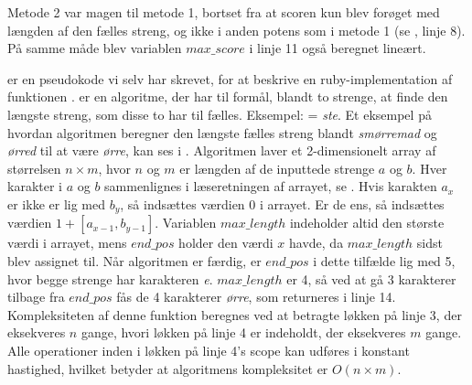 Metode 2 var magen til metode 1, bortset fra at scoren kun blev forøget med længden af den fælles streng, og ikke i anden potens som i metode 1 (se , linje 8). På samme måde blev variablen $max\_score$ i linje 11 også beregnet lineært.

\begin{algorithm} [H]
	\label{alg:compare}
	
\end{algorithm}

\begin{algorithm} [H]
	\label{alg:longest-common-substring}
	
\end{algorithm}

 er en pseudokode vi selv har skrevet, for at beskrive en ruby-implementation\cite{longestcommonsubstringrubywiki} af funktionen .  er en algoritme, der har til formål, blandt to strenge, at finde den længste streng, som disse to har til fælles. Eksempel:  = \textit{ste}. Et eksempel på hvordan algoritmen beregner den længste fælles streng blandt \textit{smørremad} og \textit{ørred} til at være \textit{ørre}, kan ses i .
Algoritmen laver et 2-dimensionelt array af størrelsen $n \times m$, hvor $n$ og $m$ er længden af de inputtede strenge $a$ og $b$. Hver karakter i $a$ og $b$ sammenlignes i læseretningen af arrayet, se . Hvis karakten $a_x$ er ikke er lig med $b_y$, så indsættes værdien 0 i arrayet. Er de ens, så indsættes værdien $1 + [a_{x-1}, b_{y-1}]$.
Variablen $max\_length$ indeholder altid den største værdi i arrayet, mens $end\_pos$ holder den værdi $x$ havde, da $max\_length$ sidst blev assignet til.
Når algoritmen er færdig, er $end\_pos$ i dette tilfælde lig med 5, hvor begge strenge har karakteren \textit{e}. $max\_length$ er 4, så ved at gå 3 karakterer tilbage fra $end\_pos$ fås de 4 karakterer \textit{ørre}, som returneres i linje 14. Kompleksiteten af denne funktion beregnes ved at betragte løkken på linje 3, der eksekveres $n$ gange, hvori løkken på linje 4 er indeholdt, der eksekveres $m$ gange. Alle operationer inden i løkken på linje 4's scope kan udføres i konstant hastighed, hvilket betyder at algoritmens kompleksitet er $O(n \times m)$.

